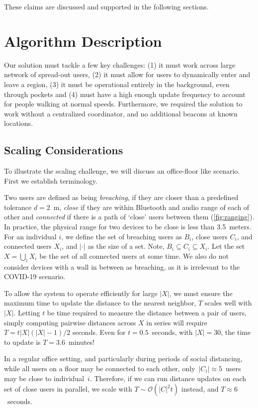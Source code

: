 \documentclass{article}
\begin{document}
These claims are discussed and supported in the following sections.

\section{Algorithm Description}
\label{sec:algorithm}

Our solution must tackle a few key challenges: (1) it must work across large network of spread-out users, (2) it must allow for users to dynamically enter and leave a region, (3) it must be operational entirely in the background, even through pockets and (4) must have a high enough update frequency to account for people walking at normal speeds. Furthermore, we required the solution to work without a centralized coordinator, and no additional beacons at known locations. 

\subsection{Scaling Considerations}

To illustrate the scaling challenge, we will discuss an office-floor like scenario. First we establish terminology.

Two users are defined as being \emph{breaching}, if they are closer than a predefined tolerance $d=2$~m, \emph{close} if they are within Bluetooth and audio range of each of other and \emph{connected} if there is a path of `close' users between them (\cref{fig:ranging}). In practice, the physical range for two devices to be close is less than 3.5~meters. For an individual $i$, we define the set of breaching users as $B_i$, close users $C_i$, and connected users $X_i$, and $| \cdot | $ as the size of a set.  Note, $B_i \subseteq C_i \subseteq X_i$. Let the set $X = \bigcup_{i}X_i$ be the set of all connected users at some time. We also do not consider devices with a wall in between as breaching, as it is irrelevant to the COVID-19 scenario. 

To allow the system to operate efficiently for large $|X|$, we must ensure the maximum time to update the distance to the nearest neighbor, $T$ scales well with $|X|$. Letting $t$ be time required to measure the distance between a pair of users, simply computing pairwise distances across $X$ in series will require $T = t |X| (|X|-1)/2 $ seconds. Even for $t=0.5$~seconds, with $|X| = 30$, the time to update is $T=3.6$~minutes!

In a regular office setting, and particularly during periods of social distancing, while all users on a floor may be connected to each other, only~$|C_i|\approx5$~users may be close to individual~$i$. Therefore, if we can run distance updates on each set of close users in parallel, we scale with $T\sim\mathcal{O}(|C|^2t)$ instead, and $T\approx 6$~seconds.
\end{document}
